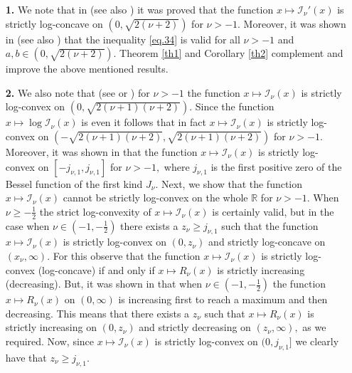 \documentclass[10pt]{amsart}
\begin{document}
\begin{enumerate}

\item[\bf 1.] We note that in \cite[Theorem 3.6.3]{bariczPhD} (see also \cite[Theorem 3.25]{barspringer}) it was proved that the function $x \mapsto \mathcal{I}_{\nu}'(x)$ is strictly log-concave on $\left(0,\sqrt{2(\nu+2)}\right)$ for $\nu> -1.$ Moreover, it was shown in \cite[Theorem 3.6.4]{bariczPhD} (see also \cite[Theorem 3.26]{barspringer}) that the inequality \eqref{eq.34} is valid for all $\nu>-1$ and $a,b\in\left(0,\sqrt{2(\nu+2)}\right).$ Theorem \ref{th1} and Corollary \ref{th2} complement and improve the above mentioned results.

\item[\bf 2.] We also note that (see \cite[Theorem 3.6.3]{bariczPhD} or \cite[Theorem 3.25]{barspringer}) for $\nu>-1$ the function $x \mapsto \mathcal{I}_{\nu}(x)$ is strictly log-convex on $\left(0,\sqrt{2(\nu+1)(\nu+2)}\right).$ Since the function $x \mapsto \log\mathcal{I}_{\nu}(x)$ is even it follows that in fact $x \mapsto \mathcal{I}_{\nu}(x)$ is strictly log-convex on $\left(-\sqrt{2(\nu+1)(\nu+2)},\sqrt{2(\nu+1)(\nu+2)}\right)$ for $\nu>-1.$ Moreover, it was shown in \cite[Theorem 4]{barexpo} that the function $x \mapsto \mathcal{I}_{\nu}(x)$ is strictly log-convex on $[-j_{\nu,1},j_{\nu,1}]$ for $\nu>-1,$ where $j_{\nu,1}$ is the first positive zero of the Bessel function of the first kind $J_{\nu}.$ Next, we show that the function $x \mapsto \mathcal{I}_{\nu}(x)$ cannot be strictly log-convex on the whole $\mathbb{R}$ for $\nu>-1.$ When $\nu\geq -\frac{1}{2}$ the strict log-convexity of $x \mapsto \mathcal{I}_{\nu}(x)$ is certainly valid, but in the case when $\nu\in\left(-1,-\frac{1}{2}\right)$ there exists a $z_{\nu}\geq j_{\nu,1}$ such that the function $x \mapsto \mathcal{I}_{\nu}(x)$ is strictly log-convex on $(0,z_{\nu})$ and strictly log-concave on $(x_{\nu},\infty).$ For this observe that the function $x \mapsto \mathcal{I}_{\nu}(x)$ is strictly log-convex (log-concave) if and only if $x\mapsto R_{\nu}(x)$ is strictly increasing (decreasing). But, it was shown in \cite[p. 446]{yuan} that when $\nu\in\left(-1,-\frac{1}{2}\right)$ the function $x\mapsto R_{\nu}(x)$ on $(0,\infty)$ is increasing first to reach a maximum and then decreasing. This means that there exists a $z_{\nu}$ such that $x\mapsto R_{\nu}(x)$ is strictly increasing on $(0,z_{\nu})$ and strictly decreasing on $(z_{\nu},\infty),$ as we required. Now, since $x \mapsto \mathcal{I}_{\nu}(x)$ is strictly log-convex on $(0,j_{\nu,1}]$ we clearly have that $z_{\nu}\geq j_{\nu,1}.$


\end{enumerate}
\end{document}
